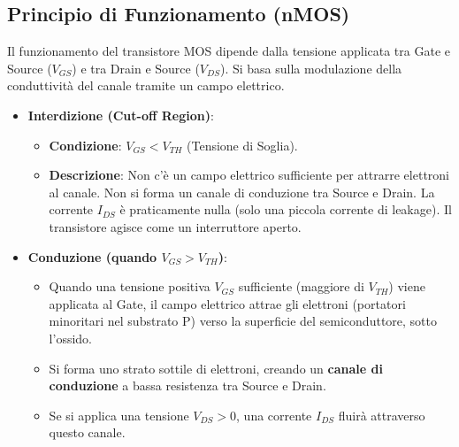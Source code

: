 \subsection{Principio di Funzionamento (nMOS)}
Il funzionamento del transistore MOS dipende dalla tensione applicata tra Gate e Source ($V_{GS}$) e tra Drain e Source ($V_{DS}$). Si basa sulla modulazione della conduttività del canale tramite un campo elettrico.
\begin{itemize}
    \item \textbf{Interdizione (Cut-off Region)}:
    \begin{itemize}
        \item \textbf{Condizione}: $V_{GS} < V_{TH}$ (Tensione di Soglia).
        \item \textbf{Descrizione}: Non c'è un campo elettrico sufficiente per attrarre elettroni al canale. Non si forma un canale di conduzione tra Source e Drain. La corrente $I_{DS}$ è praticamente nulla (solo una piccola corrente di leakage). Il transistore agisce come un interruttore aperto.
    \end{itemize}
    \item \textbf{Conduzione (quando $V_{GS} > V_{TH}$)}:
    \begin{itemize}
        \item Quando una tensione positiva $V_{GS}$ sufficiente (maggiore di $V_{TH}$) viene applicata al Gate, il campo elettrico attrae gli elettroni (portatori minoritari nel substrato P) verso la superficie del semiconduttore, sotto l'ossido.
        \item Si forma uno strato sottile di elettroni, creando un \textbf{canale di conduzione} a bassa resistenza tra Source e Drain.
        \item Se si applica una tensione $V_{DS} > 0$, una corrente $I_{DS}$ fluirà attraverso questo canale.
    \end{itemize}
\end{itemize}

